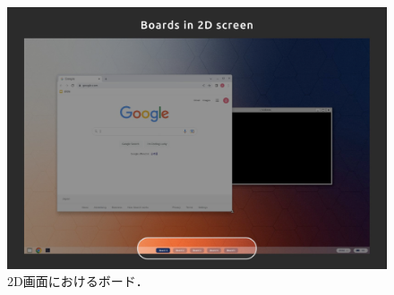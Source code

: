 \begin{figure}[htbp]
  \centering
  \includegraphics[keepaspectratio, width=0.7\linewidth]{fig/development/board-2d.png}
  \caption{2D画面におけるボード．}
  \label{fig:board-2d}
\end{figure}

